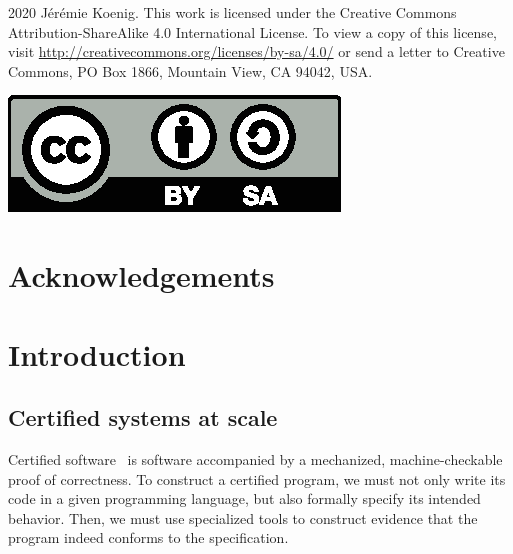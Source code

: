 \documentclass[11pt,oneside,draft]{book}
\theoremstyle{definition}
\begin{document}
\thispagestyle{empty}%
\singlespacing
\noindent
\begin{minipage}{.815\textwidth}
  \textcopyright{} 2020 J\'er\'emie Koenig.
  This work is licensed under
  the Creative Commons Attribution-ShareAlike 4.0 International License.
  To view a copy of this license,
  visit \url{http://creativecommons.org/licenses/by-sa/4.0/}
  or send a letter to
  Creative Commons, PO Box 1866, Mountain View, CA 94042, USA.
\end{minipage}
\hfill
  \includegraphics[width=.15\textwidth]{by-sa}
\doublespacing

\cleardoublepage
{}
{}
\tableofcontents

\cleardoublepage
{}
{}
\listoffigures

\cleardoublepage
{}
{}
\listoftables

\chapter{Acknowledgements} %


\mainmatter

\chapter{Introduction} %

\section{Certified systems at scale} %
\label{ssec:certsys}


Certified software~\citep{shao10}
is software accompanied by
a mechanized, machine-checkable proof of correctness.
To construct a certified program,
we must not only write its code in a given programming language,
but also formally specify its intended behavior.
Then,
we must use specialized tools
to construct evidence that the program
indeed conforms to the specification.

\end{document}
